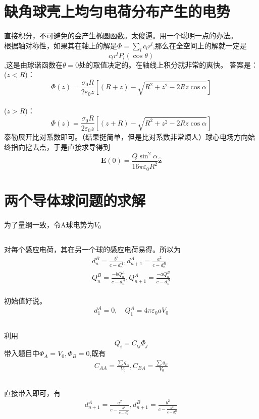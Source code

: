 \documentclass{article}
\begin{document}
\section{缺角球壳上均匀电荷分布产生的电势}
直接积分，不可避免的会产生椭圆函数。太傻逼。用一个聪明一点的办法。\\
根据轴对称性，如果其在轴上的解是$\Phi=\sum_l c_l r^l$,那么在全空间上的解就一定是$$c_l r^l P_l(\cos\theta)$$,这是由球谐函数在$\theta=0$处的取值决定的。在轴线上积分就非常的爽快。
答案是：($z < R$)：$$\Phi(z) = \frac{\sigma_0 R}{2\varepsilon_0 z} \left[ (R+z) - \sqrt{R^2 + z^2 - 2Rz\cos\alpha} \right]$$\\($z > R$)：$$\Phi(z) = \frac{\sigma_0 R}{2\varepsilon_0 z} \left[ (z+R) - \sqrt{R^2 + z^2 - 2Rz\cos\alpha} \right]$$
泰勒展开比对系数即可。（结果挺简单，但是比对系数非常烦人）球心电场方向始终指向挖去点，于是直接求导得到$$\boldsymbol{E}(0) = \frac{Q\sin^2\alpha}{16\pi\varepsilon_0 R^2} \hat{\boldsymbol{z}}$$
\section{两个导体球问题的求解}
为了量纲一致，令A球电势为$V_0$
\subsection{}
对每个感应电荷，其在另一个球的感应电荷易得。所以为
\begin{align}
\boxed{
d_n^B=\frac{b^2}{c-d_n^A},d_{n+1}^A=\frac{a^2}{c-d_n^B}
}\\
\boxed{Q_n^B=\frac{-bQ_n^A}{c-d_n^A},Q_{n+1}^A=\frac{-aQ_n^B}{c-d_n^B}}
\end{align}
\\初始值好说。\[d_1^A = 0, \quad Q_1^A = 4\pi \varepsilon_0 a V_0\]
\subsection{}
利用$$Q_i=C_{ij}\Phi_j$$带入题目中$\Phi_A=V_0,\Phi_B=0$,既有
\begin{align}
    \boxed{C_{AA}=\frac{\sum q_A}{V_0},C_{BA}=\frac{\sum q_B}{V_0}}
\end{align}
\subsection{}
直接带入即可，有\begin{align}
    \boxed{d_{n+1}^A=\frac{a^2}{c-\frac{b^2}{c-d_n^A}},{d_{n+1}^B=\frac{b^2}{c-\frac{a^2}{c-d_n^B}}}}
\end{align}
\end{document}
